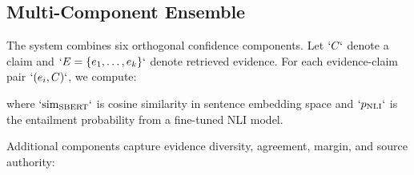\subsection{Multi-Component Ensemble}\label{multi-component-ensemble}

The system combines six orthogonal confidence components. Let \(`C`\) denote a claim and \(`E = \{e_1, \ldots, e_k\}`\) denote retrieved evidence. For each evidence-claim pair \(`(e_i, C)`\), we compute:

\begin{Shaded}
\begin{Highlighting}[]
\end{Highlighting}
\end{Shaded}

\begin{Shaded}
\begin{Highlighting}[]
\end{Highlighting}
\end{Shaded}

where \(`\text{sim}_{\text{SBERT}}`\) is cosine similarity in sentence embedding space and \(`p_{\text{NLI}}`\) is the entailment probability from a fine-tuned NLI model.

Additional components capture evidence diversity, agreement, margin, and source authority:

\begin{Shaded}
\begin{Highlighting}[]
\end{Highlighting}
\end{Shaded}

\begin{Shaded}
\begin{Highlighting}[]
\end{Highlighting}
\end{Shaded}

